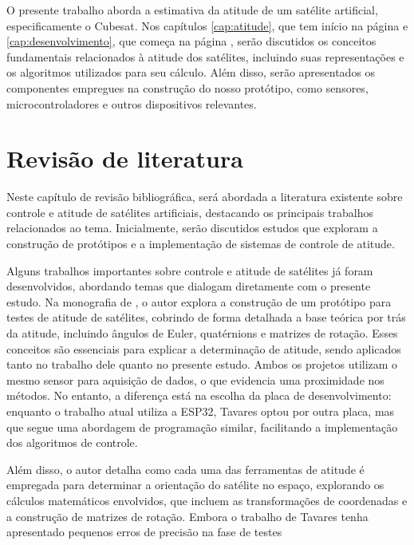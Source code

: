 \documentclass[
	12pt,				%
	openright,			%
	oneside,			%
	a4paper,			%
	english,			%
	brazil				%
	]{abntex2}
\begin{document}
O presente trabalho aborda a estimativa da atitude de um satélite artificial, especificamente o Cubesat. Nos capítulos \ref{cap:atitude}, que tem início na página \pageref{cap:atitude} e  \ref{cap:desenvolvimento}, que começa na página \pageref{cap:desenvolvimento}, serão discutidos os conceitos fundamentais relacionados à atitude dos satélites, incluindo suas representações e os algoritmos utilizados para seu cálculo. Além disso, serão apresentados os componentes empregues na construção do nosso protótipo, como sensores, microcontroladores e outros dispositivos relevantes.


\chapter{Revisão de literatura} \label{cap:revisao-de-literatura}

Neste capítulo de revisão bibliográfica, será abordada a literatura existente sobre controle e atitude de satélites artificiais, destacando os principais trabalhos relacionados ao tema. Inicialmente, serão discutidos estudos que exploram a construção de protótipos e a implementação de sistemas de controle de atitude.


Alguns trabalhos importantes sobre controle e atitude de satélites já foram desenvolvidos, abordando temas que dialogam diretamente com o presente estudo. Na monografia de \cite{tavares2017}, o autor explora a construção de um protótipo para testes de atitude de satélites, cobrindo de forma detalhada a base teórica por trás da atitude, incluindo ângulos de Euler, quatérnions e matrizes de rotação. Esses conceitos são essenciais para explicar a determinação de atitude, sendo aplicados tanto no trabalho dele quanto no presente estudo. Ambos os projetos utilizam o mesmo sensor para aquisição de dados, o que evidencia uma proximidade nos métodos. No entanto, a diferença está na escolha da placa de desenvolvimento: enquanto o trabalho atual utiliza a ESP32, Tavares optou por outra placa, mas que segue uma abordagem de programação similar, facilitando a implementação dos algoritmos de controle.

Além disso, o autor detalha como cada uma das ferramentas de atitude é empregada para determinar a orientação do satélite no espaço, explorando os cálculos matemáticos envolvidos, que incluem as transformações de coordenadas e a construção de matrizes de rotação. Embora o trabalho de Tavares tenha apresentado pequenos erros de precisão na fase de testes
\end{document}
